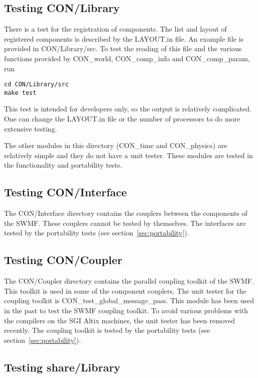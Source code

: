 \documentclass[twoside,10pt]{article}
\begin{document}
\subsection{Testing CON/Library}

There is a test for the registration of components.
The list and layout of registered components is described by the 
LAYOUT.in file. An example file is provided in CON/Library/src.
To test the reading of this file and the various functions provided
by CON\_world, CON\_comp\_info and CON\_comp\_param, run 
\begin{verbatim}
cd CON/Library/src
make test
\end{verbatim}
This test is intended for developers only, 
so the output is relatively complicated.
One can change the LAYOUT.in file or the number of processors to
do more extensive testing.

The other modules in this directory (CON\_time and CON\_physics) are
relatively simple and they do not have a unit tester. These modules
are tested in the functionality and portability tests.

\subsection{Testing CON/Interface}

The CON/Interface directory contains the couplers between the 
components of the SWMF. These couplers cannot be tested by themselves.
The interfaces are tested by the portability tests 
(see section~\ref{sec:portability}).

\subsection{Testing CON/Coupler}

The CON/Coupler directory contains the parallel coupling toolkit of the SWMF.
This toolkit is used in some of the component couplers. 
The unit tester for the coupling toolkit is CON\_test\_global\_message\_pass.
This module has been used in the past to test the SWMF coupling toolkit. 
To avoid various problems with the compilers on the SGI Altix machines, 
the unit tester has been removed recently. 
The coupling toolkit is tested by the portability tests
(see section~\ref{sec:portability}).


\subsection{Testing share/Library}
\end{document}
